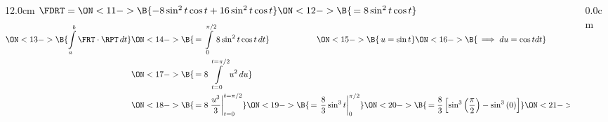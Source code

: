 \begin{frame}
\begin{columns}
\begin{column}{12.0cm}
$\FDRT = 
\ON<11->{\B{-8\sin^2 t\cos t + 16\sin^2 t\cos t}} 
\ON<12->{\B{\, = 8\sin^2 t\cos t}}$
\begin{align*}
	\ON<13->{\B{\int \limits_{a}^{b} \FRT \cdot \RPT \, dt}}  
		& \ON<14->{\B{\, = \int \limits_{0}^{\pi/2} 8\sin^2 t\cos t \, dt}} \hspace{2.0cm}
		\ON<15->{\B{\, u=\sin t}} 
		\ON<16->{\B{\, \implies du=\cos t dt}} \\
		& \ON<17->{\B{\, = 8\int \limits_{t=0}^{t=\pi/2} u^2 \, du}}\\
		& \ON<18->{\B{\, = 8\left.\frac{u^3}{3}\right|_{t=0}^{t=\pi/2}}}
		  \ON<19->{\B{\, = \left.\frac{8}{3}\sin^3t\right|_{0}^{\pi/2}}}
		  \ON<20->{\B{\, = \frac{8}{3}\left[\sin^3\left(\frac{\pi}{2}\right) - \sin^3\left(0\right)\right]}}
		  \ON<21->{\B{\, = \frac{8}{3}}}  \\
\end{align*}

\vspace{9.6cm}

\end{column}\begin{column}{0.0cm}\end{column}\end{columns}
\end{frame}

